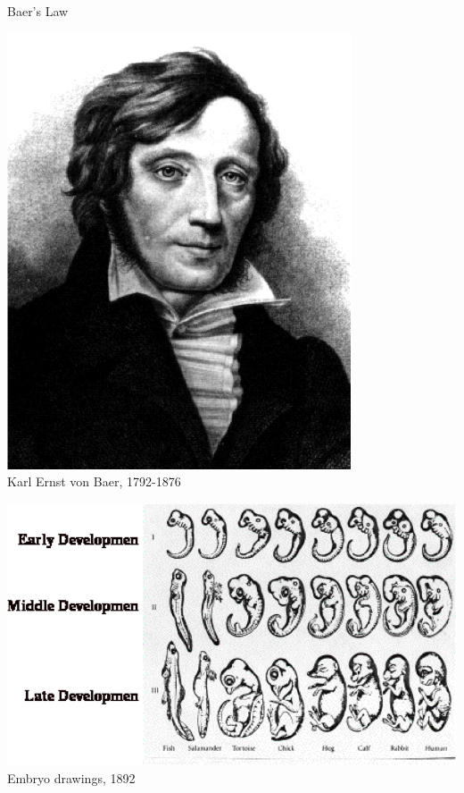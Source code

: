 \documentclass[10pt]{beamer}
\begin{document}
\begin{frame}{Baer's Law}

\begin{minipage}{0.3\textwidth}
\centering
\includegraphics[width=\textwidth]{vonbaer} \\
Karl Ernst von Baer, 1792-1876
\end{minipage}
\hfill
\begin{minipage}{0.65\textwidth}
\centering
\includegraphics[width=\textwidth]{stages_development}\\
Embryo drawings, 1892
\end{minipage}

\end{frame}
\end{document}
